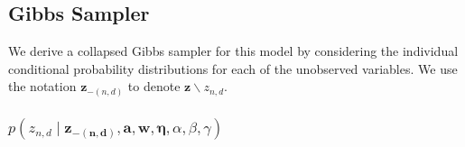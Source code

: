 \subsection{Gibbs Sampler}

We derive a collapsed Gibbs sampler for this model by considering
the individual conditional probability distributions for each of the
unobserved variables. We use the notation $\mathbf{z}_{-(n,d)}$ to
denote $\mathbf{z}\backslash z_{n,d}$. %



\subsubsection{$p\left(z_{n,d}\mid\mathbf{z_{-\left(n,d\right)}},\mathbf{a},\mathbf{w},\mathbf{\eta},\alpha,\beta,\gamma\right)$}


